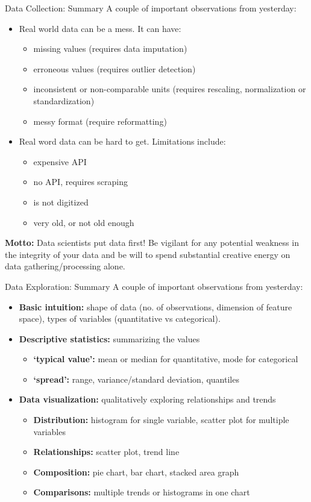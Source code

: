 \documentclass[12pt,t]{beamer}
\begin{document}
\begin{frame}{Data Collection: Summary} 
\vskip-0.4cm
A couple of important observations from yesterday:
\begin{itemize}
\item Real world data can be a mess. It can have:
\begin{itemize}
\item missing values (requires data imputation)
\item erroneous values (requires outlier detection)
\item inconsistent or non-comparable units (requires rescaling, normalization or standardization)
\item messy format (require reformatting)
\end{itemize}
\item Real word data can be hard to get. Limitations include:
\begin{itemize}
\item expensive API
\item no API, requires scraping
\item is not digitized
\item very old, or not old enough
\end{itemize}
\end{itemize}
\textbf{Motto:} Data scientists put data first! Be vigilant for any potential weakness in the integrity of your data and be will to spend substantial creative energy on data gathering/processing alone.
\end{frame}

\begin{frame}{Data Exploration: Summary} 
A couple of important observations from yesterday:
\begin{itemize}
\item \textbf{Basic intuition:} shape of data (no. of observations, dimension of feature space), types of variables (quantitative vs categorical).
\item \textbf{Descriptive statistics:} summarizing the values 
\begin{itemize}
\item \textbf{`typical value':} mean or median for quantitative, mode for categorical
\item \textbf{`spread':} range, variance/standard deviation, quantiles
\end{itemize}
\item \textbf{Data visualization:} qualitatively exploring relationships and trends
\begin{itemize}
\item \textbf{Distribution:} histogram for single variable, scatter plot for multiple variables
\item \textbf{Relationships:} scatter plot, trend line
\item \textbf{Composition:} pie chart, bar chart, stacked area graph
\item \textbf{Comparisons:} multiple trends or histograms in one chart
\end{itemize}
\end{itemize}
\end{frame}
\end{document}
